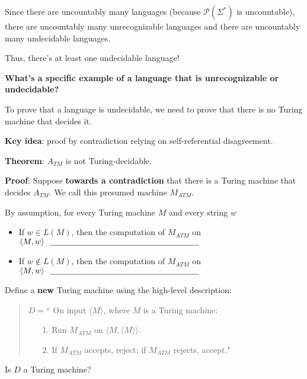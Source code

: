 \documentclass[12pt, oneside]{article}
\begin{document}
    Since there are uncountably many languages (because $\mathcal{P}(\Sigma^*)$
    is uncountable), there are uncountably many unrecognizable languages
    and there are uncountably many undecidable languages.
    
    
    Thus, there's at least one undecidable language!
    
    \vfill
    
    {\bf What's a specific example of a language that is unrecognizable or undecidable?}
    
    To prove that a language is undecidable, we need to prove that there is no Turing machine that decides it.
    
    {\bf Key idea}: proof by contradiction relying on self-referential disagreement.
    
    

{\bf  Theorem}: $A_{TM}$  is  not  Turing-decidable.

{\bf  Proof}: Suppose {\bf towards a  contradiction}  that there  is a Turing machine  that decides $A_{TM}$.  
We call this presumed machine  $M_{ATM}$.

By  assumption, for every  Turing machine  $M$ and every  string $w$

\begin{itemize}
\item If $w \in L(M)$, then  the computation of $M_{ATM}$  on  $\langle M,w \rangle ~~ \underline{\phantom{\hspace{2.5in}}}$
\item If $w \notin L(M)$, then  the computation of $M_{ATM}$  on  $\langle M,w \rangle ~~ \underline{\phantom{\hspace{2.5in}}}$
\end{itemize}


Define  a {\bf new} Turing machine using  the high-level description:
\begin{quote}
$D =  $`` On  input $\langle M \rangle$, where  $M$  is  a Turing machine:
\begin{itemize}
\item[1.] Run  $M_{ATM}$ on  $\langle M, \langle M \rangle  \rangle$.
\item[2.] If $M_{ATM}$ accepts, reject; if  $M_{ATM}$ rejects, accept."
\end{itemize}
\end{quote}


Is $D$ a  Turing machine?

\vspace{50pt}
\end{document}
